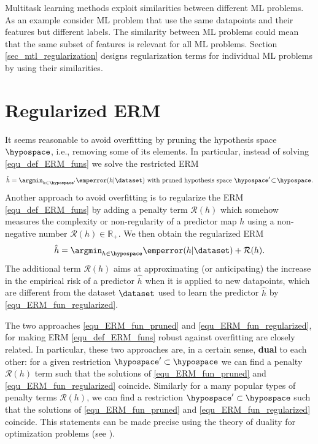 \documentclass[12pt]{report}
\begin{document}
Multitask learning methods exploit similarities between different ML problems. 
As an example consider ML problem that use the same datapoints and their 
features but different labels. The similarity between ML problems could mean 
that the same subset of features is relevant for all ML problems. 
Section \ref{sec_mtl_regularization} designs regularization terms for individual 
ML problems by using their similarities. 



\section{Regularized ERM} 
\label{sec_reg_ERM}

It seems reasonable to avoid overfitting by pruning the 
hypothesis space $\hypospace$, i.e., removing some of 
its elements. In particular, instead of solving \eqref{equ_def_ERM_funs} 
we solve the restricted ERM 
\begin{equation}
\label{equ_ERM_fun_pruned}
   \hat{h} = \argmin_{h \in \hypospace'} \emperror(h|\dataset) \mbox{ with pruned hypothesis space } \hypospace' \!\subset\!\hypospace. 
\end{equation}
Another approach to avoid overfitting is to regularize the ERM \eqref{equ_def_ERM_funs} 
by adding a penalty term $\mathcal{R}(h)$ which somehow measures the complexity or 
non-regularity of a predictor map $h$ using a non-negative number $\mathcal{R}(h) \in \mathbb{R}_{+}$. 
We then obtain the regularized ERM 
\begin{equation}
\label{equ_ERM_fun_regularized}
  \hat{h} = \argmin_{h \in \hypospace} \emperror(h|\dataset)  + \mathcal{R}(h). 
\end{equation} 
The additional term $\mathcal{R}(h)$ aims at approximating 
(or anticipating) the increase in the empirical risk of a predictor 
$\hat{h}$ when it is applied to new datapoints, which are 
different from the dataset $\dataset$ used to learn the 
predictor $\hat{h}$ by \eqref{equ_ERM_fun_regularized}. 

The two approaches \eqref{equ_ERM_fun_pruned} and \eqref{equ_ERM_fun_regularized}, for 
making ERM \eqref{equ_def_ERM_funs} robust against overfitting are closely related. In particular, 
these two approaches are, in a certain sense, {\bf dual} to each other: for a given restriction 
$\hypospace' \subset \hypospace$ we can find a penalty $\mathcal{R}(h)$ term such that the 
solutions of \eqref{equ_ERM_fun_pruned} and \eqref{equ_ERM_fun_regularized} coincide. Similarly 
for a many popular types of penalty terms $\mathcal{R}(h)$, we can find a restriction $\hypospace' \subset \hypospace$ 
such that the solutions of \eqref{equ_ERM_fun_pruned} and \eqref{equ_ERM_fun_regularized} coincide. 
This statements can be made precise using the theory of duality for optimization problems (see \cite{BertsekasNonLinProgr}). 
\end{document}
